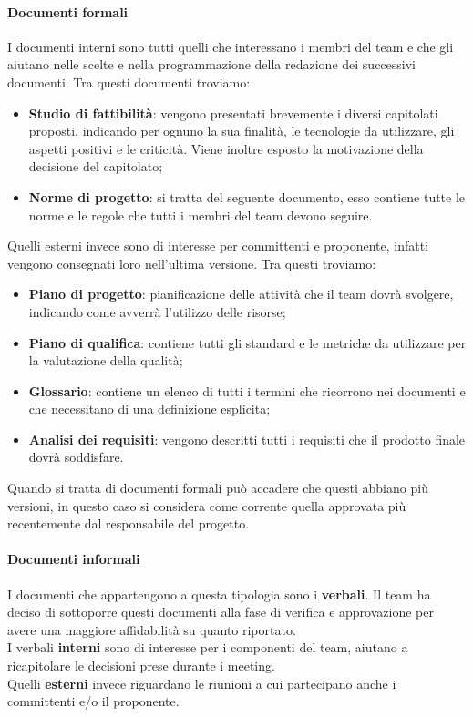 \paragraph{Documenti formali}
I documenti interni sono tutti quelli che interessano i membri del team e che gli aiutano nelle scelte e nella programmazione della redazione dei successivi documenti.
Tra questi documenti troviamo:
\begin{itemize}
    \item\textbf{Studio di fattibilità}: vengono presentati brevemente i diversi capitolati proposti, indicando per ognuno la sua finalità, le tecnologie da utilizzare, gli aspetti positivi e le criticità. Viene inoltre esposto la motivazione della decisione del capitolato;
    \item\textbf{Norme di progetto}: si tratta del seguente documento, esso contiene tutte le norme e le regole che tutti i membri del team devono seguire.
\end{itemize}
Quelli esterni invece sono di interesse per committenti e proponente, infatti vengono consegnati loro nell'ultima versione.
Tra questi troviamo:
\begin{itemize}
    \item\textbf{Piano di progetto}: pianificazione delle attività che il team dovrà svolgere, indicando come avverrà l'utilizzo delle risorse;
    \item\textbf{Piano di qualifica}: contiene tutti gli standard e le metriche da utilizzare per la valutazione della qualità;
    \item\textbf{Glossario}: contiene un elenco di tutti i termini che ricorrono nei documenti e che necessitano di una definizione esplicita;
    \item\textbf{Analisi dei requisiti}: vengono descritti tutti i requisiti che il prodotto finale dovrà soddisfare.
\end{itemize}
Quando si tratta di documenti formali può accadere che questi abbiano più versioni, in questo caso si considera come corrente quella approvata più recentemente dal responsabile del progetto.

\paragraph{Documenti informali}
I documenti che appartengono a questa tipologia sono i \textbf{verbali}.
Il team ha deciso di sottoporre questi documenti alla fase di verifica e approvazione per avere una maggiore affidabilità su quanto riportato.\\
I verbali \textbf{interni} sono di interesse per i componenti del team, aiutano a ricapitolare le decisioni prese durante i meeting.\\
Quelli \textbf{esterni} invece riguardano le riunioni a cui partecipano anche i committenti e/o il proponente.

